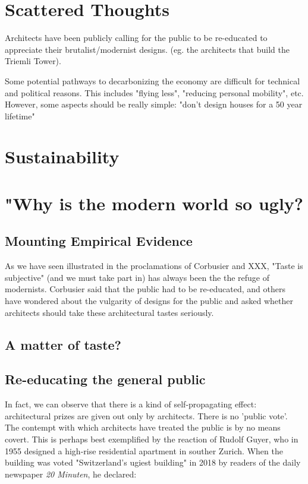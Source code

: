 \documentclass{article}
\begin{document}
\clearpage
\section{Scattered Thoughts}

Architects have been publicly calling for the public to be re-educated to appreciate their brutalist/modernist designs. (eg. the architects that build the Triemli Tower).

Some potential pathways to decarbonizing the economy are difficult for technical and political reasons. This includes "flying less", "reducing personal mobility", etc.
However, some aspects should be really simple: "don't design houses for a 50 year lifetime"

\section{Sustainability}


\clearpage
\section{"Why is the modern world so ugly?}

\subsection{Mounting Empirical Evidence}

As we have seen illustrated in the proclamations of Corbusier and XXX, "Taste is subjective" (and we must take part in) has always been the the refuge of modernists. Corbusier said that the public had to be re-educated, and others have wondered about the vulgarity of designs for the public and asked whether architects should take these architectural tastes seriously.

\subsection{A matter of taste?}

\subsection{Re-educating the general public}

In fact, we can observe that there is a kind of self-propagating effect: architectural prizes are given out only by architects. There is no 'public vote'. The contempt with which architects have treated the public is by no means covert. This is perhaps best exemplified by the reaction of Rudolf Guyer, who in 1955 designed a high-rise residential apartment in souther Zurich. When the building was voted "Switzerland's ugiest building" in 2018 by readers of the daily newspaper \textit{20 Minuten}, he declared:
\end{document}
